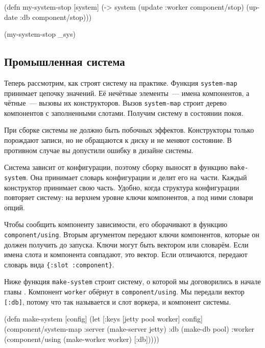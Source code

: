 \begin{english}
  \begin{clojure}
(defn my-system-stop
  [system]
  (-> system
      (update :worker component/stop)
      (update :db component/stop)))

(my-system-stop _sys)
  \end{clojure}
\end{english}

\subsection{Промышленная система}


Теперь рассмотрим, как строят систему на практике. Функция \verb|system-map|
принимает цепочку значений. Её нечётные элементы~--- имена компонентов, а
чётные~--- вызовы их конструкторов. Вызов \verb|system-map| строит дерево
компонентов с заполненными слотами. Получим систему в состоянии покоя.


При сборке системы не должно быть побочных эффектов. Конструкторы только
порождают записи, но не обращаются к диску и не меняют состояние. В противном
случае вы допустили ошибку в дизайне системы.

Система зависит от конфигурации, поэтому сборку выносят в функцию
\verb|make-system|. Она принимает словарь конфигурации и делит его
на~части. Каждый конструктор принимает свою часть. Удобно, когда структура
конфигурации повторяет систему: на верхнем уровне ключи компонентов, а под ними
словари опций.

Чтобы сообщить компоненту зависимости, его оборачивают в функцию
\verb|component/using|. Вторым аргументом передают ключи компонентов, которые он
должен получить до запуска. Ключи могут быть вектором или словарём. Если имена
слота и компонента совпадают, это вектор. Если отличаются, передают словарь вида
\verb|{:slot :component}|.

Ниже функция \verb|make-system| строит систему, о которой мы договорились в
начале главы . Компонент \verb|worker| обёрнут в
\verb|component/using|. Мы передали вектор \verb|[:db]|, потому что так
называется и слот воркера, и компонент системы.

\ifnarrow

\begin{english}
  \begin{clojure}
(defn make-system
  [config]
  (let [{:keys [jetty pool worker]}
        config]
    (component/system-map
     :server (make-server jetty)
     :db     (make-db pool)
     :worker (component/using
               (make-worker worker)
               [:db]))))
  \end{clojure}
\end{english}

